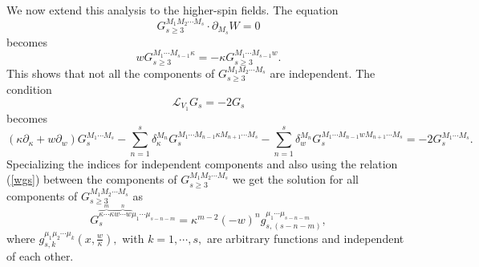 \documentclass[a4paper,12pt]{article}
\begin{document}
We now extend this analysis to the higher-spin fields. The equation
\begin{equation}
G_{s\geq 3}^{M_{1}M_{2}\cdots M_{s}}\cdot \partial _{M_{s}}W=0
\end{equation}
becomes
\begin{equation}
wG_{s\geq 3}^{M_{1}\cdots M_{s-1}\kappa }=-\kappa G_{s\geq 3}^{M_{1}\cdots
M_{s-1}w}.  \label{wgs}
\end{equation}
This shows that not all the components of $G_{s\geq 3}^{M_{1}M_{2}\cdots
M_{s}}$ are independent. The condition
\begin{equation}
\mathcal{L}_{V_{1}}G_{s}=-2G_{s}
\end{equation}
becomes
\begin{equation}
\left( \kappa \partial _{\kappa }+w\partial _{w}\right) G_{s}^{M_{1}\cdots
M_{s}}-\sum_{n=1}^{s}\delta _{\kappa }^{M_{n}}G_{s}^{M_{1}\cdots
M_{n-1}\kappa M_{n+1}\cdots M_{s}}-\sum_{n=1}^{s}\delta
_{w}^{M_{n}}G_{s}^{M_{1}\cdots M_{n-1}wM_{n+1}\cdots
M_{s}}=-2G_{s}^{M_{1}\cdots M_{s}}.
\end{equation}
Specializing the indices for independent components and also using the
relation (\ref{wgs}) between the components of $G_{s\geq
3}^{M_{1}M_{2}\cdots M_{s}}$ we get the solution for all components of $%
G_{s\geq 3}^{M_{1}M_{2}\cdots M_{s}}$ as
\begin{equation}
G_{s}^{\overbrace{\kappa \cdots \kappa }^{m}\overbrace{w\cdots w}^{n}\mu
_{1}\cdots \mu _{s-n-m}}=\kappa ^{m-2}\left( -w\right)
^{n}g_{s,(s-n-m)}^{\mu _{1}\cdots \mu _{s-n-m}},
\end{equation}
where $g_{s,k}^{\mu _{1}\mu _{2}\cdots \mu _{k}}\left( x,\frac{w}{\kappa }%
\right) ,$ with $k=1,\cdots ,s,$ are arbitrary functions and independent of
each other.
\end{document}
